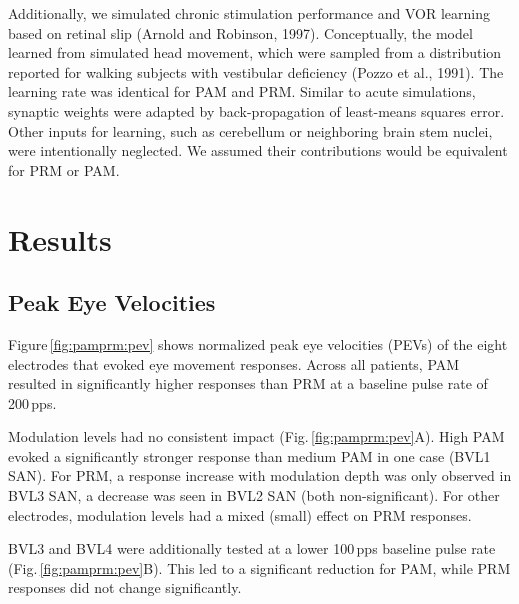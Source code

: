 Additionally, we simulated chronic stimulation performance and VOR learning based on retinal slip (Arnold and Robinson, 1997). Conceptually, the model learned from simulated head movement, which were sampled from a distribution reported for walking subjects with vestibular deficiency (Pozzo et al., 1991). The learning rate was identical for PAM and PRM. Similar to acute simulations, synaptic weights were adapted by back-propagation of least-means squares error. Other inputs for learning, such as cerebellum or neighboring brain stem nuclei, were intentionally neglected. We assumed their contributions would be equivalent for PRM or PAM.

\section{Results}
\subsection{Peak Eye Velocities}
Figure\,\ref{fig:pamprm:pev} shows normalized peak eye velocities (PEVs) of the eight electrodes that evoked eye movement responses. Across all patients, PAM resulted in significantly higher responses than PRM at a baseline pulse rate of 200\,pps. 

Modulation levels had no consistent impact (Fig.\,\ref{fig:pamprm:pev}A). High PAM evoked a significantly stronger response than medium PAM in one case (BVL1 SAN). For PRM, a response increase with modulation depth was only observed in BVL3 SAN, a decrease was seen in BVL2 SAN (both non-significant). For other electrodes, modulation levels had a mixed (small) effect on PRM responses. 

BVL3 and BVL4 were additionally tested at a lower 100\,pps baseline pulse rate (Fig.\,\ref{fig:pamprm:pev}B). This led to a significant reduction for PAM, while PRM responses did not change significantly.

